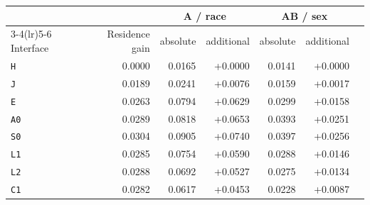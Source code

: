 \begin{tabular}{@{}lrrrrrr@{}}
\toprule
& & \multicolumn{2}{c}{A / race} & \multicolumn{2}{c}{AB / sex} & \\
\cmidrule(lr){3-4}\cmidrule(lr){5-6}
Interface & Residence gain & absolute & additional & absolute & additional & \multicolumn{1}{c}{} \\
\midrule
\texttt{H} & 0.0000 & 0.0165 & +0.0000 & 0.0141 & +0.0000 & \\
\texttt{J} & 0.0189 & 0.0241 & +0.0076 & 0.0159 & +0.0017 & \\
\texttt{E} & 0.0263 & 0.0794 & +0.0629 & 0.0299 & +0.0158 & \\
\texttt{A0} & 0.0289 & 0.0818 & +0.0653 & 0.0393 & +0.0251 & \\
\texttt{S0} & 0.0304 & 0.0905 & +0.0740 & 0.0397 & +0.0256 & \\
\texttt{L1} & 0.0285 & 0.0754 & +0.0590 & 0.0288 & +0.0146 & \\
\texttt{L2} & 0.0288 & 0.0692 & +0.0527 & 0.0275 & +0.0134 & \\
\texttt{C1} & 0.0282 & 0.0617 & +0.0453 & 0.0228 & +0.0087 & \\
\bottomrule
\end{tabular}
